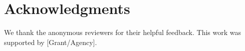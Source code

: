 \documentclass[11pt,a4paper]{article}
\begin{document}
\section*{Acknowledgments}

We thank the anonymous reviewers for their helpful feedback. 
This work was supported by [Grant/Agency].






\end{document}
